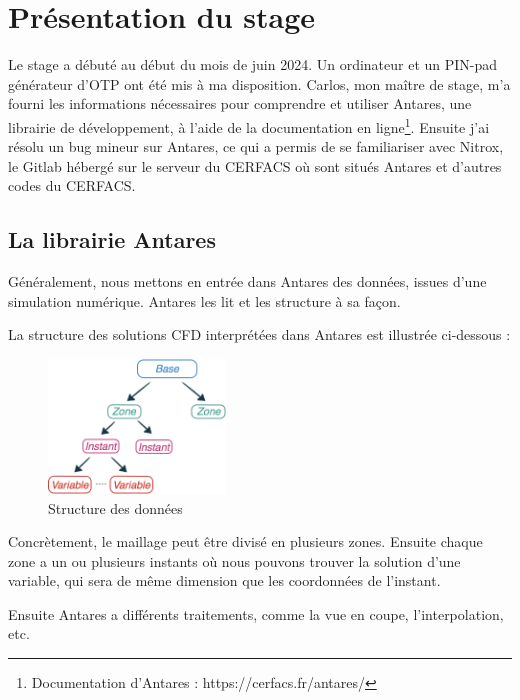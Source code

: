 \chapter{Présentation du stage}

Le stage a débuté au début du mois de juin 2024. Un ordinateur et un PIN-pad générateur d'\ac{OTP} ont été mis à ma disposition. Carlos, mon maître de stage, m'a fourni les informations nécessaires pour comprendre et utiliser Antares\cite{antares}, une librairie de développement, à l'aide de la documentation en ligne\footnote{Documentation d'Antares : https://cerfacs.fr/antares/}. Ensuite j'ai résolu un bug mineur sur Antares, ce qui a permis de se familiariser avec Nitrox, le Gitlab hébergé sur le serveur du CERFACS où sont situés Antares et d'autres codes du CERFACS.


\section{La librairie Antares}

Généralement, nous mettons en entrée dans Antares des données, issues d'une simulation numérique. Antares les lit et les structure à sa façon.

La structure des solutions CFD interprétées dans Antares est illustrée ci-dessous :

\begin{figure}[ht!]
\centering
\includegraphics[width=0.42\textwidth]{images/data_structure_1.png}
\caption{Structure des données}
\end{figure}

Concrètement, le maillage peut être divisé en plusieurs zones.
Ensuite chaque zone a un ou plusieurs instants où nous pouvons trouver la solution d'une variable, qui sera de même dimension que les coordonnées de l'instant.

Ensuite Antares a différents traitements, comme la vue en coupe, l'interpolation, etc.

